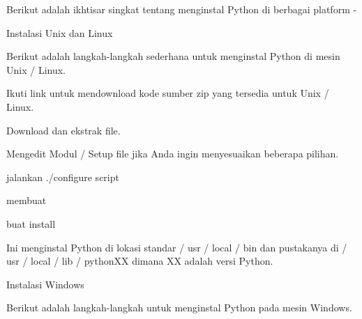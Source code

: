 \vspace{14pt}
\noindent 
{\fontsize{14pt}{14pt}\selectfont Berikut adalah ikhtisar singkat tentang menginstal Python di berbagai platform - \\} \par
\vspace{14pt}
\noindent 
{\fontsize{14pt}{14pt}\selectfont Instalasi Unix dan Linux \\} \par
\noindent 
{\fontsize{14pt}{14pt}\selectfont Berikut adalah langkah-langkah sederhana untuk menginstal Python di mesin Unix / Linux. \\} \par
\noindent 
{\fontsize{14pt}{14pt}\selectfont Ikuti link untuk mendownload kode sumber zip yang tersedia untuk Unix / Linux. \\} \par
\vspace{14pt}
\noindent 
{\fontsize{14pt}{14pt}\selectfont Download dan ekstrak file. \\} \par
\vspace{14pt}
\noindent 
{\fontsize{14pt}{14pt}\selectfont Mengedit Modul / Setup file jika Anda ingin menyesuaikan beberapa pilihan. \\} \par
\vspace{14pt}
\noindent 
{\fontsize{14pt}{14pt}\selectfont jalankan ./configure script \\} \par
\vspace{14pt}
\noindent 
{\fontsize{14pt}{14pt}\selectfont membuat \\} \par
\vspace{14pt}
\noindent 
{\fontsize{14pt}{14pt}\selectfont buat install \\} \par
\vspace{14pt}
\noindent 
{\fontsize{14pt}{14pt}\selectfont Ini menginstal Python di lokasi standar / usr / local / bin dan pustakanya di / usr / local / lib / pythonXX dimana XX adalah versi Python. \\} \par
\vspace{14pt}
\noindent 
{\fontsize{14pt}{14pt}\selectfont Instalasi Windows \\} \par
\noindent 
{\fontsize{14pt}{14pt}\selectfont Berikut adalah langkah-langkah untuk menginstal Python pada mesin Windows. \\} \par
